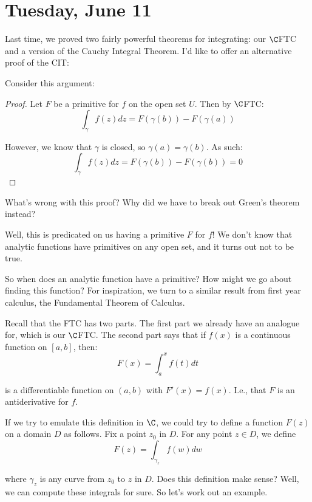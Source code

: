 \section{Tuesday, June 11}


Last time, we proved two fairly powerful theorems for integrating: our $\C$FTC and a version of the Cauchy Integral Theorem. I'd like to offer an alternative proof of the CIT:

\begin{ex}{}{} Consider this argument:

\begin{proof}Let $F$ be a primitive for $f$ on the open set $U$. Then by $\C$FTC:
$$\int_{\gamma} f(z)dz = F(\gamma(b)) - F(\gamma(a))$$

However, we know that $\gamma$ is closed, so $\gamma(a) = \gamma(b)$. As such:
$$\int_{\gamma} f(z)dz = F(\gamma(b)) - F(\gamma(b)) = 0$$\end{proof}

What's wrong with this proof? Why did we have to break out Green's theorem instead?

Well, this is predicated on us having a primitive $F$ for $f$! We don't know that analytic functions have primitives on any open set, and it turns out not to be true.
\end{ex}

So when does an analytic function have a primitive? How might we go about finding this function? For inspiration, we turn to a similar result from first year calculus, the Fundamental Theorem of Calculus.

Recall that the FTC has two parts. The first part we already have an analogue for, which is our $\C$FTC. The second part says that if $f(x)$ is a continuous function on $[a,b]$, then:
$$F(x) = \int_a^xf(t)dt$$

\noin is a differentiable function on $(a,b)$ with $F'(x) = f(x)$. I.e., that $F$ is an antiderivative for $f$.

If we try to emulate this definition in $\C$, we could try to define a function $F(z)$ on a domain $D$ as follows. Fix a point $z_0$ in $D$. For any point $z\in D$, we define
$$F(z) = \int_{\gamma_z}f(w)dw$$

\noin where $\gamma_z$ is any curve from $z_0$ to $z$ in $D$. Does this definition make sense? Well, we can compute these integrals for sure. So let's work out an example.


